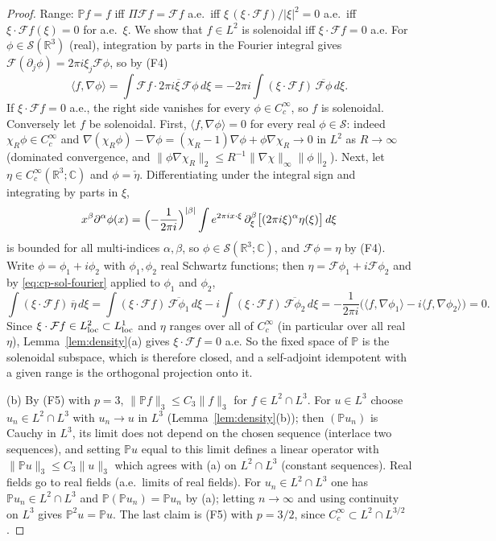 \documentclass[11pt]{article}
\theoremstyle{definition}
\theoremstyle{plain}
\newcommand{\R}{\mathbb R}
\newcommand{\norm}[1]{\lVert #1\rVert}
\begin{document}
\begin{proof}
Range: $\mathbb Pf=f$ iff $\Pi\mathcal Ff=\mathcal Ff$ a.e.\ iff
$\xi\,(\xi\cdot\mathcal Ff)/|\xi|^2=0$ a.e.\ iff $\xi\cdot\mathcal Ff(\xi)=0$
for a.e.\ $\xi$.  We show that $f\in L^2$ is solenoidal iff
$\xi\cdot\mathcal Ff=0$ a.e.  For $\phi\in\mathcal S(\R^3)$ (real),
integration by parts in the Fourier integral gives
$\mathcal F(\partial_j\phi)=2\pi i\xi_j\mathcal F\phi$, so by (F4)
\begin{equation}\label{eq:cp-sol-fourier}
 \langle f,\nabla\phi\rangle
 =\int\mathcal Ff\cdot\overline{2\pi i\xi\,\mathcal F\phi}\,d\xi
 =-2\pi i\int(\xi\cdot\mathcal Ff)\,\overline{\mathcal F\phi}\,d\xi .
\end{equation}
If $\xi\cdot\mathcal Ff=0$ a.e., the right side vanishes for every
$\phi\in C_c^\infty$, so $f$ is solenoidal.  Conversely let $f$ be
solenoidal.  First, $\langle f,\nabla\phi\rangle=0$ for every real
$\phi\in\mathcal S$: indeed $\chi_R\phi\in C_c^\infty$ and
$\nabla(\chi_R\phi)-\nabla\phi=(\chi_R-1)\nabla\phi+\phi\nabla\chi_R\to0$
in $L^2$ as $R\to\infty$ (dominated convergence, and
$\norm{\phi\nabla\chi_R}_2\le R^{-1}\norm{\nabla\chi}_\infty\norm\phi_2$).
Next, let $\eta\in C_c^\infty(\R^3;\mathbb C)$ and $\phi=\check\eta$.
Differentiating under the integral sign and integrating by parts in $\xi$,
\[
 x^\beta\partial^\alpha\phi(x)
 =\Bigl(-\frac1{2\pi i}\Bigr)^{|\beta|}
 \int e^{2\pi ix\cdot\xi}\,\partial_\xi^\beta\bigl[(2\pi i\xi)^\alpha\eta(\xi)\bigr]\,d\xi
\]
is bounded for all multi-indices $\alpha,\beta$, so
$\phi\in\mathcal S(\R^3;\mathbb C)$, and $\mathcal F\phi=\eta$ by (F4).
Write $\phi=\phi_1+i\phi_2$ with $\phi_1,\phi_2$ real Schwartz functions;
then $\eta=\mathcal F\phi_1+i\mathcal F\phi_2$ and by
\eqref{eq:cp-sol-fourier} applied to $\phi_1$ and $\phi_2$,
\[
 \int(\xi\cdot\mathcal Ff)\,\overline\eta\,d\xi
 =\int(\xi\cdot\mathcal Ff)\,\overline{\mathcal F\phi_1}\,d\xi
 -i\int(\xi\cdot\mathcal Ff)\,\overline{\mathcal F\phi_2}\,d\xi
 =-\frac1{2\pi i}\bigl(\langle f,\nabla\phi_1\rangle-i\langle f,\nabla\phi_2\rangle\bigr)=0 .
\]
Since $\xi\cdot\mathcal Ff\in L^2_{\rm loc}\subset L^1_{\rm loc}$ and
$\eta$ ranges over all of $C_c^\infty$ (in particular over all real
$\eta$), Lemma~\ref{lem:density}(a) gives $\xi\cdot\mathcal Ff=0$ a.e.
So the fixed space of $\mathbb P$ is the solenoidal subspace, which is
therefore closed, and a self-adjoint idempotent with a given range is the
orthogonal projection onto it.

(b) By (F5) with $p=3$, $\norm{\mathbb Pf}_3\le C_3\norm f_3$ for
$f\in L^2\cap L^3$.  For $u\in L^3$ choose $u_n\in L^2\cap L^3$ with
$u_n\to u$ in $L^3$ (Lemma~\ref{lem:density}(b)); then $(\mathbb Pu_n)$
is Cauchy in $L^3$, its limit does not depend on the chosen sequence
(interlace two sequences), and setting $\mathbb Pu$ equal to this limit
defines a linear operator with $\norm{\mathbb Pu}_3\le C_3\norm u_3$
which agrees with (a) on $L^2\cap L^3$ (constant sequences).  Real fields
go to real fields (a.e.\ limits of real fields).  For
$u_n\in L^2\cap L^3$ one has $\mathbb Pu_n\in L^2\cap L^3$ and
$\mathbb P(\mathbb Pu_n)=\mathbb Pu_n$ by (a); letting $n\to\infty$ and
using continuity on $L^3$ gives $\mathbb P^2u=\mathbb Pu$.  The last
claim is (F5) with $p=3/2$, since $C_c^\infty\subset L^2\cap L^{3/2}$.


\end{proof}
\end{document}
